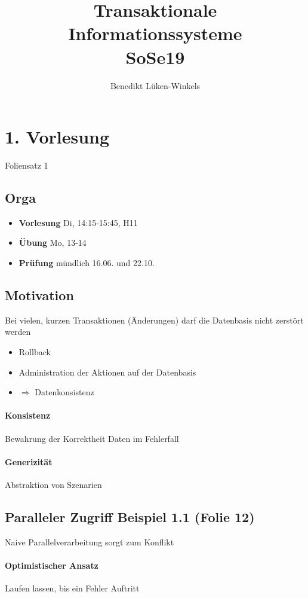 \documentclass[ngerman]{scrartcl}
\title{Transaktionale Informationssysteme \\ SoSe19}
\author{Benedikt Lüken-Winkels}
\begin{document}
\maketitle
\tableofcontents
\newpage
\begin{abstract}
\end{abstract}

\section{1. Vorlesung}
Foliensatz 1
\subsection*{Orga}
\begin{itemize}
  \item \textbf{Vorlesung} Di, 14:15-15:45, H11
  \item \textbf{Übung} Mo, 13-14
  \item \textbf{Prüfung} mündlich 16.06. und 22.10.
\end{itemize}
\subsection*{Motivation}
Bei vielen, kurzen Transaktionen (Änderungen) darf die Datenbasis nicht zerstört werden
\begin{itemize}
  \item Rollback
  \item Administration der Aktionen auf der Datenbasis
  \item $\Rightarrow$ Datenkonsistenz
\end{itemize}
\paragraph*{Konsistenz}
Bewahrung der Korrektheit Daten im Fehlerfall

\paragraph*{Generizität}
Abstraktion von Szenarien

\subsection*{Paralleler Zugriff Beispiel 1.1 (Folie 12)}
Naive Parallelverarbeitung sorgt zum Konflikt

\paragraph*{Optimistischer Ansatz}
Laufen lassen, bis ein Fehler Auftritt
\end{document}
